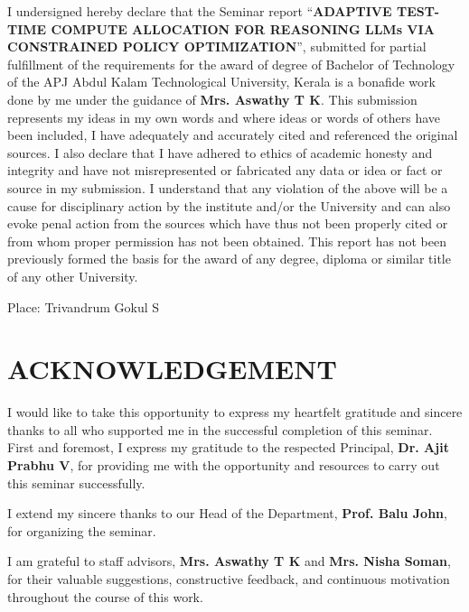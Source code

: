 \documentclass[12pt,a4paper,titlepage]{report}
\begin{document}
\noindent I undersigned hereby declare that the Seminar report ``\textbf{ADAPTIVE TEST-TIME COMPUTE ALLOCATION FOR REASONING LLMs VIA CONSTRAINED POLICY OPTIMIZATION}'', submitted for partial fulfillment of the requirements for the award of degree of Bachelor of Technology of the APJ Abdul Kalam Technological University, Kerala is a bonafide work done by me under the guidance of \textbf{Mrs. Aswathy T K}. This submission represents my ideas in my own words and where ideas or words of others have been included, I have adequately and accurately cited and referenced the original sources. I also declare that I have adhered to ethics of academic honesty and integrity and have not misrepresented or fabricated any data or idea or fact or source in my submission. I understand that any violation of the above will be a cause for disciplinary action by the institute and/or the University and can also evoke penal action from the sources which have thus not been properly cited or from whom proper permission has not been obtained. This report has not been previously formed the basis for the award of any degree, diploma or similar title of any other University.

\vspace{0.8in}
\noindent Place: Trivandrum \hfill Gokul S \\


\clearpage

\chapter*{ACKNOWLEDGEMENT}

\noindent I would like to take this opportunity to express my heartfelt gratitude and sincere thanks to all who supported me in the successful completion of this seminar. First and foremost, I express my gratitude to the respected Principal, \textbf{Dr. Ajit Prabhu V}, for providing me with the opportunity and resources to carry out this seminar successfully.

\vspace{0.15in}
\noindent I extend my sincere thanks to our Head of the Department, \textbf{Prof. Balu John}, for organizing the seminar.

\vspace{0.15in}
\noindent I am grateful to staff advisors, \textbf{Mrs. Aswathy T K} and \textbf{Mrs. Nisha Soman}, for their valuable suggestions, constructive feedback, and continuous motivation throughout the course of this work.
\end{document}
